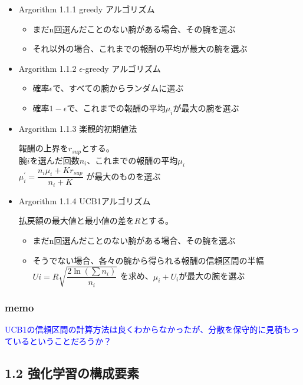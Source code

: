 \documentclass[]{jarticle}
\begin{document}
\begin{itemize}
	\item Argorithm 1.1.1 greedy アルゴリズム

\begin{itemize}
\item まだn回選んだことのない腕がある場合、その腕を選ぶ
\item それ以外の場合、これまでの報酬の平均が最大の腕を選ぶ 
\end{itemize}
	
	\item Argorithm 1.1.2 $\epsilon$-greedy アルゴリズム

\begin{itemize}
	\item 確率$\epsilon$で、すべての腕からランダムに選ぶ 
	\item 確率$1-\epsilon$で、これまでの報酬の平均$\mu_i$が最大の腕を選ぶ
\end{itemize}

\item Argorithm 1.1.3 楽観的初期値法

報酬の上界を$r_{sup}$とする。 \\
腕$i$を選んだ回数$n_{i}$、これまでの報酬の平均$\mu_i$ \\
$\mu^{'}_{i} = \dfrac{n_{i}\mu_i + Kr_{sup}}{n_{i}+K}$  が最大のものを選ぶ

\item Argorithm 1.1.4 UCB1アルゴリズム

払戻額の最大値と最小値の差を$R$とする。
\begin{itemize}
	\item まだn回選んだことのない腕がある場合、その腕を選ぶ　
	\item そうでない場合、各々の腕から得られる報酬の信頼区間の半幅　\\ $Ui = R\sqrt{\dfrac{2\ln(\sum n_i)}{n_i}}$ を求め、$\mu_i+U_i$が最大の腕を選ぶ
\end{itemize}
	
\end{itemize}

\subsubsection*{memo}
\textcolor{blue}{UCB1の信頼区間の計算方法は良くわからなかったが、分散を保守的に見積もっているということだろうか？}

\subsection*{1.2 強化学習の構成要素}
\end{document}
